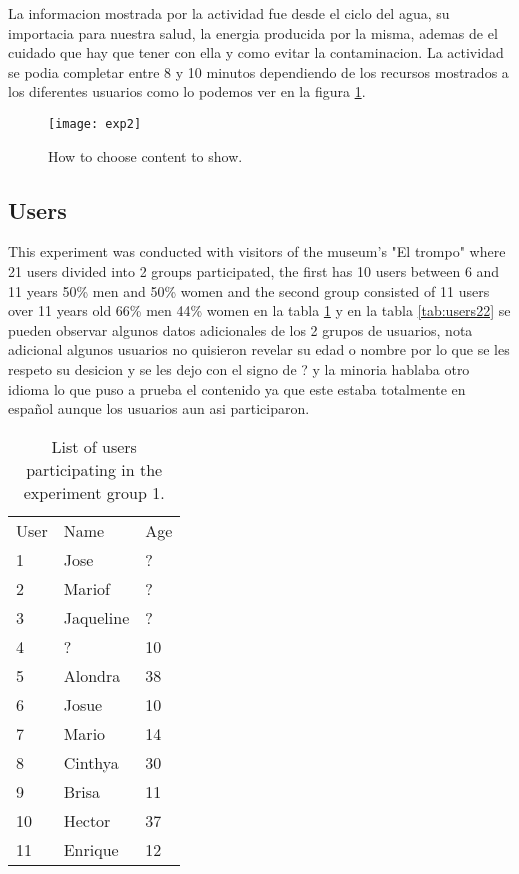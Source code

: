La informacion mostrada por la actividad fue desde el ciclo del agua, su importacia para nuestra salud, la energia producida por la misma, ademas de el cuidado que hay que tener con ella y como evitar la contaminacion. La actividad se podia completar entre 8 y 10 minutos dependiendo de los recursos mostrados a los diferentes usuarios como lo podemos ver en la figura \ref{exp2}.

\begin{figure}[ht!]  
\centering  
\texttt{[image: exp2]}
\caption{How to choose content to show.}  
\label{exp2}  
\end{figure}

\subsection{Users}
This experiment was conducted with visitors of the museum’s "El trompo" where 21 users divided into 2 groups participated, the ﬁrst has 10 users between 6 and 11 years 50\% men and 50\% women and the second group consisted of 11 users over 11 years old  66\% men 44\% women en la tabla \ref{tab:users21} y en la tabla \ref{tab:users22} se pueden observar algunos datos adicionales de los 2 grupos de usuarios, nota adicional algunos usuarios no quisieron revelar su edad o nombre por lo que se les respeto su desicion y se les dejo con el signo de ? y la minoria hablaba otro idioma lo que puso a prueba el contenido ya que este estaba totalmente en español aunque los usuarios aun asi participaron.
\begin{table}
\small
\centering
\captionsetup{font=footnotesize}
\caption{List of users participating in the experiment group 1.}
\label{tab:users21} 
\small
\begin{tabular}{p{3cm} p{3cm} p{3cm} }
\hline{\smallskip}
User & Name	& Age\\
\noalign{\smallskip}\hline\noalign{\smallskip}
\small{	1	}& \small{	Jose 	}& \small{	?	}\\
\small{	2	}& \small{	Mariof	}& \small{	?	}\\
\small{	3	}& \small{	Jaqueline	}& \small{	?	}\\
\small{	4	}& \small{	? 	}& \small{	10	}\\
\small{	5	}& \small{	Alondra	}& \small{	38	}\\
\small{	6	}& \small{	Josue 	}& \small{	10	}\\
\small{	7	}& \small{	Mario	}& \small{	14	}\\
\small{	8	}& \small{	Cinthya	}& \small{	30	}\\
\small{	9	}& \small{	Brisa	}& \small{	11	}\\
\small{	10	}& \small{	Hector 	}& \small{	37	}\\
\small{	11	}& \small{	Enrique	}& \small{	12	}\\
\hline
\end{tabular}
\end{table}
 
